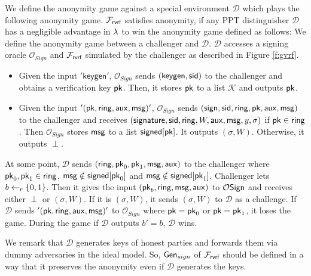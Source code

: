	\begin{definition}[Anonymity]\label{def:anonymity} We define the anonymity game against a special environment $ \mathcal{D} $ which plays the following anonymity game.
		$ \mathcal{F}_{\textsf{rvrf}} $ satisfies anonymity, if any PPT distinguisher $ \mathcal{D} $ has a negligible advantage in $ \lambda $ to win the anonymity game defined as follows:
		We define the anonymity game between a challenger and $ \mathcal{D} $.  $\mathcal{D}$ accesses a signing oracle $ \mathcal{O}_{Sign} $ and $ \mathcal{F}_{\textsf{rvrf}} $ simulated by the challenger as described in Figure \ref{f:gvrf}. 
		\begin{itemize}
			\item Given the input $ '\mathsf{keygen}' $, $\mathcal{O}_{Sign} $ sends $ (\mathsf{keygen, \textsf{sid}}) $ to the challenger and obtains a verification key $ \mathsf{pk} $. Then, it stores $ \mathsf{pk} $ to a list $ \mathcal{K} $ and outputs $ \mathsf{pk} $.
			\item Given the input $ '(\mathsf{pk},\mathsf{ring},\mathsf{aux},\mathsf{msg})' $, $ \mathcal{O}_{Sign} $ sends $ (\mathsf{sign}, \textsf{sid},\mathsf{ring},\mathsf{pk}, \mathsf{aux}, \mathsf{msg}) $ to the challenger and receives $ (\mathsf{signature}, \textsf{sid}, \mathsf{ring}, W,\mathsf{aux}, \mathsf{msg}, y, \sigma) $ if $ \mathsf{pk} \in \mathsf{ring} $.  Then $ \mathcal{O}_{Sign} $ stores $ \mathsf{msg} $ to a list $ {\mathsf{signed}}[\mathsf{pk}]  $.
			It outputs $ (\sigma,W) $. Otherwise, it outputs $ \perp $.
		\end{itemize}
		At some point,	
		$ \mathcal{D} $ sends $ (\mathsf{ring}, \mathsf{pk}_0, \mathsf{pk}_1, \mathsf{msg},\mathsf{aux})$ to  the challenger where $ \mathsf{pk}_0, \mathsf{pk}_1 \in \mathsf{ring} $, $ \mathsf{msg}  \notin {\ensuremath{\mathsf{signed}}}[\mathsf{pk}_0]$ and $ \mathsf{msg}  \notin {\ensuremath{\mathsf{signed}}}[\mathsf{pk}_1] $.  Challenger lets $ b \leftarrow_r\{0,1\}$. Then it gives the input $ (\mathsf{pk}_b, \mathsf{ring}, \mathsf{msg},\mathsf{aux}) $ to $ \mathcal{O}\mathsf{Sign} $ and receives either $ \perp $ or $(\sigma,W)$. If it is $ (\sigma,W) $, it sends $ (\sigma,W) $ to $ \mathcal{D} $ as a challenge.
		If $ \mathcal{D} $ sends $ '(\mathsf{pk},\mathsf{ring},\mathsf{aux},\mathsf{msg})' $ to $ \mathcal{O}_{Sign} $ where $ \mathsf{pk} = \mathsf{pk}_0 $ or $ \mathsf{pk} = \mathsf{pk}_1 $, it loses the game. 
		During the game if $ \mathcal{D} $ outputs $ b' = b $, $ \mathcal{D} $ wins.
		
		
	\end{definition}
	
	
	
	We remark that $ \mathcal{D} $ generates keys of honest parties and forwards them via dummy adversaries in the ideal model. So, $ \mathsf{Gen}_{sign} $ of $ \mathcal{F}_{\textsf{rvrf}} $ should be defined in a way that it preserves the anonymity even if $ \mathcal{D} $ generates the keys.
	
